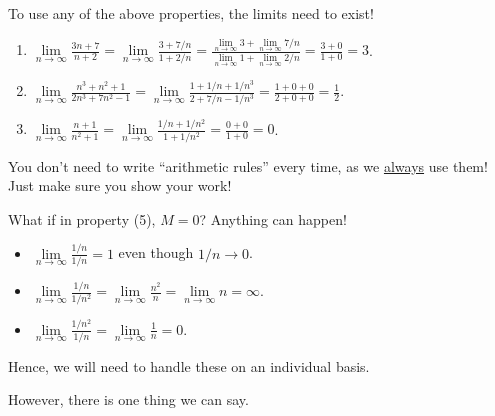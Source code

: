 \begin{Remark}{}{}
    To use any of the above properties, the limits need to exist!
\end{Remark}
\begin{Example}{}{}
    \begin{enumerate}[(1)]
        \item $ \displaystyle \lim\limits_{{n} \to {\infty}}\frac{3n+7}{n+2}
                  =\lim\limits_{{n} \to {\infty}}\frac{3+7/n}{1+2/n}
                  =\frac{\lim\limits_{{n} \to {\infty}}3+\lim\limits_{{n} \to {\infty}}7/n}{\lim\limits_{{n} \to {\infty}}1+\lim\limits_{{n} \to {\infty}}2/n}
                  =\frac{3+0}{1+0}
                  =3 $.
        \item $ \displaystyle
                  \lim\limits_{{n} \to {\infty}}\frac{n^3+n^2+1}{2n^3+7n^2-1}
                  =\lim\limits_{{n} \to {\infty}}\frac{1+1/n+1/n^3}{2+7/n-1/n^3}
                  =\frac{1+0+0}{2+0+0}
                  =\frac{1}{2} $.
        \item $ \displaystyle
                  \lim\limits_{{n} \to {\infty}}\frac{n+1}{n^2+1}
                  =\lim\limits_{{n} \to {\infty}}\frac{1/n+1/n^2}{1+1/n^2}
                  =\frac{0+0}{1+0}
                  =0 $.
    \end{enumerate}
\end{Example}
\begin{Remark}{}{}
    You don't need to write ``arithmetic rules''
    every time, as we \underline{always} use them!
    Just make sure you show your work!
\end{Remark}
\begin{Example}{}{}
    What if in property (5), $ M=0 $? Anything can happen!
    \begin{itemize}
        \item $ \displaystyle \lim\limits_{{n} \to {\infty}}\frac{1/n}{1/n}=1 $
              even though $ 1/n\to 0 $.
        \item $ \displaystyle \lim\limits_{{n} \to {\infty}}\frac{1/n}{1/n^2}=
                  \lim\limits_{{n} \to {\infty}}\frac{n^2}{n}=
                  \lim\limits_{{n} \to {\infty}}n=\infty $.
        \item $ \displaystyle \lim\limits_{{n} \to {\infty}}\frac{1/n^2}{1/n}=
                  \lim\limits_{{n} \to {\infty}}\frac{1}{n}=0 $.
    \end{itemize}
    Hence, we will need to handle these on an individual basis.
\end{Example}
However, there is one thing we can say.

